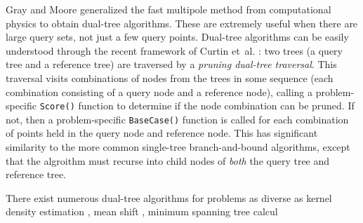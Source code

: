 \documentclass{article} %
\begin{document}
Gray and Moore \cite{nbody} generalized the fast multipole method from
computational physics to obtain dual-tree algorithms.  These are extremely
useful when there are large query sets, not just a few query points.  Dual-tree
algorithms can be easily understood through the recent framework of Curtin
et~al. \cite{curtin2013tree}: two trees (a query tree and a reference tree) are
traversed by a {\it pruning dual-tree traversal}.  This traversal visits
combinations of nodes from the trees in some sequence (each combination consisting of a query node and a
reference node), calling a problem-specific \texttt{Score()} function to
determine if the node combination can be pruned.  If not, then a
problem-specific \texttt{BaseCase()} function is called for each combination of
points held in the query node and reference node.  This has significant
similarity to the more common single-tree branch-and-bound algorithms, except
that the algroithm must recurse into child nodes of {\it both} the query tree
and reference tree.

There exist numerous dual-tree algorithms for problems as diverse as kernel
density estimation \cite{gray2003nonparametric}, mean shift \cite{wang2007fast},
minimum spanning tree calcul
\end{document}
